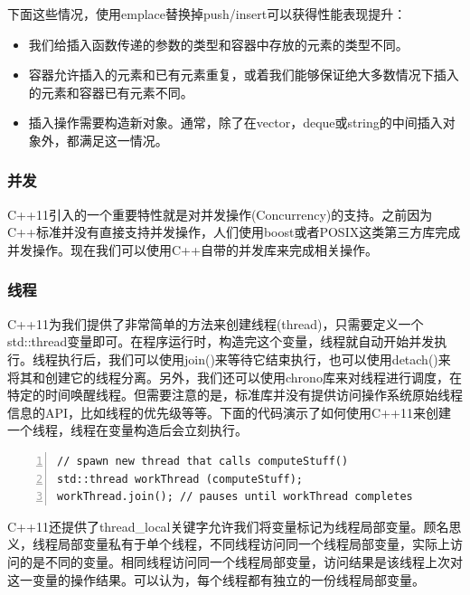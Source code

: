 \documentclass{ctexart}
\begin{document}
下面这些情况，使用emplace替换掉push/insert可以获得性能表现提升：

\begin{itemize}
	\item 我们给插入函数传递的参数的类型和容器中存放的元素的类型不同。
	\item 容器允许插入的元素和已有元素重复，或着我们能够保证绝大多数情况下插入的元素和容器已有元素不同。
	\item 插入操作需要构造新对象。通常，除了在vector，deque或string的中间插入对象外，都满足这一情况。
\end{itemize}

\subsubsection*{并发}

C++11引入的一个重要特性就是对并发操作(Concurrency)的支持。之前因为C++标准并没有直接支持并发操作，人们使用boost或者POSIX这类第三方库完成并发操作。现在我们可以使用C++自带的并发库来完成相关操作。

\subsubsection{线程}

C++11为我们提供了非常简单的方法来创建线程(thread)，只需要定义一个std::thread变量即可。在程序运行时，构造完这个变量，线程就自动开始并发执行。线程执行后，我们可以使用join()来等待它结束执行，也可以使用detach()来将其和创建它的线程分离。另外，我们还可以使用chrono库来对线程进行调度，在特定的时间唤醒线程。但需要注意的是，标准库并没有提供访问操作系统原始线程信息的API，比如线程的优先级等等。下面的代码演示了如何使用C++11来创建一个线程，线程在变量构造后会立刻执行。

\begin{lstlisting}[language={[ANSI]C},keywordstyle=\color{blue!70},commentstyle=\color{red!50!green!50!blue!50},frame=shadowbox, rulesepcolor=\color{red!20!green!20!blue!20},basicstyle=\small,numbers=left, numberstyle=\tiny,breaklines=true]
// spawn new thread that calls computeStuff()
std::thread workThread (computeStuff);
workThread.join(); // pauses until workThread completes
\end{lstlisting}

C++11还提供了thread\_local关键字允许我们将变量标记为线程局部变量。顾名思义，线程局部变量私有于单个线程，不同线程访问同一个线程局部变量，实际上访问的是不同的变量。相同线程访问同一个线程局部变量，访问结果是该线程上次对这一变量的操作结果。可以认为，每个线程都有独立的一份线程局部变量。
\end{document}
